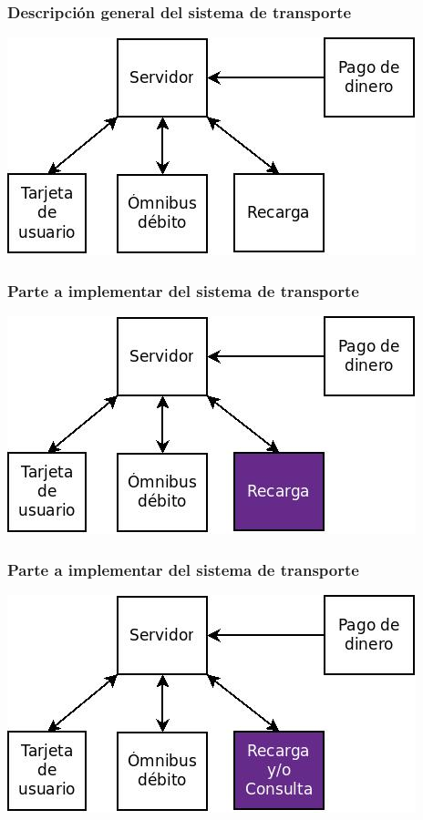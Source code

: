 \documentclass{beamer}
\begin{document}
\begin{frame}
	\frametitle{Descripción general del sistema de transporte}
	\begin{center}	
		\includegraphics[scale=.5]{Imagenes/sistrans.jpg}
	\end{center}
\end{frame}

\begin{frame}
	\frametitle{Parte a implementar del sistema de transporte}
	\begin{center}
		\includegraphics[scale=.5]{Imagenes/sistrans1.jpg}
	\end{center}
\end{frame}

\begin{frame}
	\frametitle{Parte a implementar del sistema de transporte}
	\begin{center}
		\includegraphics[scale=.5]{Imagenes/sistrans2.jpg}
	\end{center}
\end{frame}
\end{document}
